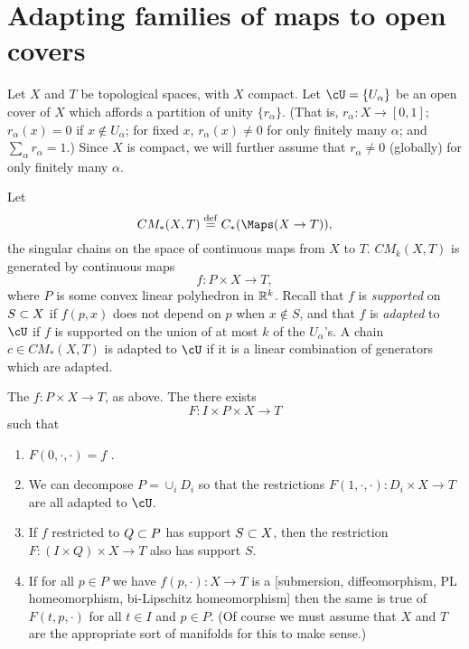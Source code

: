 
\section{Adapting families of maps to open covers}  \label{sec:localising}


Let $X$ and $T$ be topological spaces, with $X$ compact.
Let $\cU = \{U_\alpha\}$ be an open cover of $X$ which affords a partition of
unity $\{r_\alpha\}$.
(That is, $r_\alpha : X \to [0,1]$; $r_\alpha(x) = 0$ if $x\notin U_\alpha$;
for fixed $x$, $r_\alpha(x) \ne 0$ for only finitely many $\alpha$; and $\sum_\alpha r_\alpha = 1$.)
Since $X$ is compact, we will further assume that $r_\alpha \ne 0$ (globally) 
for only finitely
many $\alpha$.

Let
\[
	CM_*(X, T) \deq C_*(\Maps(X\to T)) ,
\]
the singular chains on the space of continuous maps from $X$ to $T$.
$CM_k(X, T)$ is generated by continuous maps
\[
	f: P\times X \to T ,
\]
where $P$ is some convex linear polyhedron in $\mathbb{R}^k$.
Recall that $f$ is {\it supported} on $S\subset X$ if $f(p, x)$ does not depend on $p$ when
$x \notin S$, and that $f$ is {\it adapted} to $\cU$ if 
$f$ is supported on the union of at most $k$ of the $U_\alpha$'s.
A chain $c \in CM_*(X, T)$ is adapted to $\cU$ if it is a linear combination of 
generators which are adapted.

\begin{lemma} \label{basic_adaptation_lemma}
The $f: P\times X \to T$, as above.
The there exists
\[
	F: I \times P\times X \to T
\]
such that
\begin{enumerate}
\item $F(0, \cdot, \cdot) = f$ .
\item We can decompose $P = \cup_i D_i$ so that
the restrictions $F(1, \cdot, \cdot) : D_i\times X\to T$ are all adapted to $\cU$.
\item If $f$ restricted to $Q\subset P$ has support $S\subset X$, then the restriction
$F: (I\times Q)\times X\to T$ also has support $S$.
\item If for all $p\in P$ we have $f(p, \cdot):X\to T$ is a 
[submersion, diffeomorphism, PL homeomorphism, bi-Lipschitz homeomorphism]
then the same is true of $F(t, p, \cdot)$ for all $t\in I$ and $p\in P$.
(Of course we must assume that $X$ and $T$ are the appropriate 
sort of manifolds for this to make sense.)
\end{enumerate}
\end{lemma}



